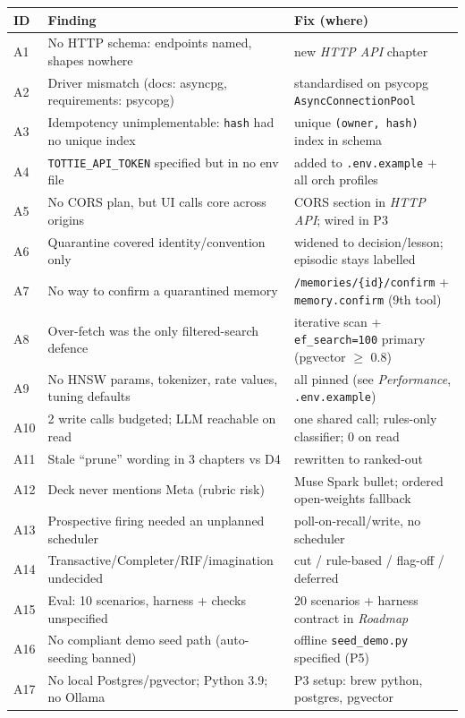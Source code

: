 \begin{longtable}{@{}p{}p{}p{}@{}}
\toprule
ID & Finding & Fix (where) \\
\midrule
A1 & No HTTP schema: endpoints named, shapes nowhere & new \emph{HTTP API} chapter \\
A2 & Driver mismatch (docs: asyncpg, requirements: psycopg) & standardised on psycopg \texttt{AsyncConnectionPool} \\
A3 & Idempotency unimplementable: \texttt{hash} had no unique index & unique \texttt{(owner, hash)} index in schema \\
A4 & \texttt{TOTTIE\_API\_TOKEN} specified but in no env file & added to \texttt{.env.example} + all orch profiles \\
A5 & No CORS plan, but UI calls core across origins & CORS section in \emph{HTTP API}; wired in P3 \\
A6 & Quarantine covered identity/convention only & widened to decision/lesson; episodic stays labelled \\
A7 & No way to confirm a quarantined memory & \texttt{/memories/\{id\}/confirm} + \texttt{memory.confirm} (9th tool) \\
A8 & Over-fetch was the only filtered-search defence & iterative scan + \texttt{ef\_search=100} primary (pgvector $\geq$ 0.8) \\
A9 & No HNSW params, tokenizer, rate values, tuning defaults & all pinned (see \emph{Performance}, \texttt{.env.example}) \\
A10 & 2 write calls budgeted; LLM reachable on read & one shared call; rules-only classifier; 0 on read \\
A11 & Stale ``prune'' wording in 3 chapters vs D4 & rewritten to ranked-out \\
A12 & Deck never mentions Meta (rubric risk) & Muse Spark bullet; ordered open-weights fallback \\
A13 & Prospective firing needed an unplanned scheduler & poll-on-recall/write, no scheduler \\
A14 & Transactive/Completer/RIF/imagination undecided & cut / rule-based / flag-off / deferred \\
A15 & Eval: 10 scenarios, harness + checks unspecified & 20 scenarios + harness contract in \emph{Roadmap} \\
A16 & No compliant demo seed path (auto-seeding banned) & offline \texttt{seed\_demo.py} specified (P5) \\
A17 & No local Postgres/pgvector; Python 3.9; no Ollama & P3 setup: brew python, postgres, pgvector \\
\bottomrule
\end{longtable}

